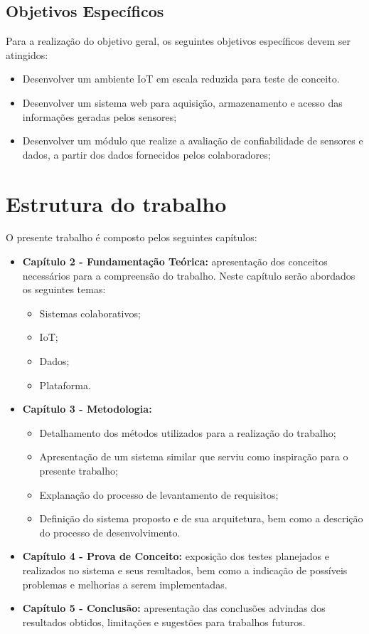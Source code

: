 \subsection{Objetivos Específicos}
Para a realização do objetivo geral, os seguintes objetivos específicos devem ser atingidos:
\begin{itemize}
  \item Desenvolver um ambiente \acrshort{IoT} em escala reduzida para teste de conceito.
  \item Desenvolver um sistema web para aquisição, armazenamento e acesso das informações geradas pelos sensores;
  \item Desenvolver um módulo que realize a avaliação de confiabilidade de sensores e dados, a partir dos dados fornecidos pelos colaboradores;

\end{itemize}
\section{Estrutura do trabalho}
O presente trabalho é composto pelos seguintes capítulos:
\begin{itemize}
  \item \textbf{Capítulo 2 - Fundamentação Teórica:} apresentação dos conceitos necessários para a compreensão do
  trabalho. Neste capítulo serão abordados os seguintes temas:
  \begin{itemize}
    \item Sistemas colaborativos;
    \item \acrlong{IoT};
    \item Dados;
    \item Plataforma.
  \end{itemize}
  \item \textbf{Capítulo 3 - Metodologia:}
\begin{itemize}
  \item Detalhamento dos métodos utilizados para a realização do trabalho;
  \item Apresentação de um sistema similar que serviu como inspiração para o presente trabalho;
  \item Explanação do processo de levantamento de requisitos;
  \item Definição do sistema proposto e de sua arquitetura, bem como a descrição do processo de desenvolvimento.
\end{itemize}
  \item \textbf{Capítulo 4 - Prova de Conceito:} exposição dos testes planejados e realizados no sistema e seus resultados, bem como a indicação de possíveis problemas e melhorias a serem implementadas.
  \item \textbf{Capítulo 5 - Conclusão:} apresentação das conclusões advindas dos resultados obtidos, limitações e
  sugestões para trabalhos futuros.
\end{itemize}

